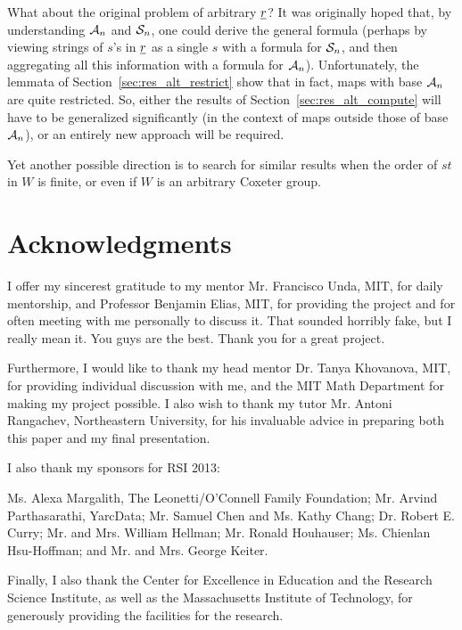 What about the original problem of arbitrary $\ul r$?  It was originally hoped that, by understanding $\AA_n$ and $\SS_n$, one could derive the general formula (perhaps by viewing strings of $s$'s in $\ul r$ as a single $s$ with a formula for $\SS_n$, and then aggregating all this information with a formula for $\AA_n$).  Unfortunately, the lemmata of Section~\ref{sec:res_alt_restrict} show that in fact, maps with base $\AA_n$ are quite restricted.  So, either the results of Section~\ref{sec:res_alt_compute} will have to be generalized significantly (in the context of maps outside those of base $\AA_n$), or an entirely new approach will be required.

Yet another possible direction is to search for similar results when the order of $st$ in $W$ is finite, or even if $W$ is an arbitrary Coxeter group.

\section{Acknowledgments} 
I offer my sincerest gratitude to my mentor Mr. Francisco Unda, MIT, for daily mentorship, and Professor Benjamin Elias, MIT, for providing the project and for often meeting with me personally to discuss it.  That sounded horribly fake, but I really mean it.  You guys are the best.  Thank you for a great project.

Furthermore, I would like to thank my head mentor Dr. Tanya Khovanova, MIT, for providing individual discussion with me, and the MIT Math Department for making my project possible.
I also wish to thank my tutor Mr. Antoni Rangachev, Northeastern University, for his invaluable advice in preparing both this paper and my final presentation.

I also thank my sponsors for RSI 2013:
\begin{inparaenum}[]
	\ii Ms. Alexa Margalith, The Leonetti\slash O'Connell Family Foundation;
	\ii Mr. Arvind Parthasarathi, YarcData;
	\ii Mr. Samuel Chen and Ms. Kathy Chang;
	\ii Dr. Robert E. Curry;
	\ii Mr. and Mrs. William Hellman;
	\ii Mr. Ronald Houhauser;
	\ii Ms. Chienlan Hsu-Hoffman; and
	\ii Mr. and Mrs. George Keiter.
\end{inparaenum}

Finally, I also thank the Center for Excellence in Education and the Research Science Institute, as well as the Massachusetts Institute of Technology, for generously providing the facilities for the research.
